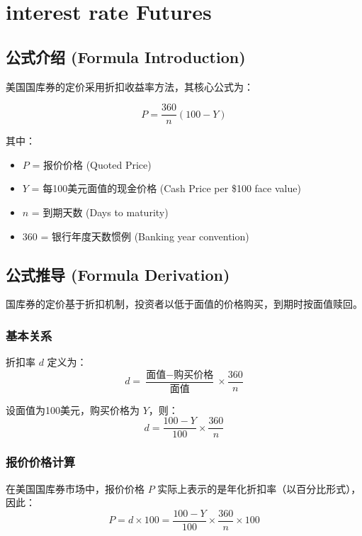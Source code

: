 \chapter{interest rate Futures}

\section{公式介绍 (Formula Introduction)}

美国国库券的定价采用折扣收益率方法，其核心公式为：

\begin{equation}
P = \frac{360}{n}(100 - Y)
\end{equation}

其中：
\begin{itemize}
    \item $P$ = 报价价格 (Quoted Price)
    \item $Y$ = 每100美元面值的现金价格 (Cash Price per \$100 face value)
    \item $n$ = 到期天数 (Days to maturity)
    \item $360$ = 银行年度天数惯例 (Banking year convention)
\end{itemize}

\section{公式推导 (Formula Derivation)}

国库券的定价基于折扣机制，投资者以低于面值的价格购买，到期时按面值赎回。

\subsection{基本关系}
折扣率 $d$ 定义为：
\begin{equation}
d = \frac{\text{面值} - \text{购买价格}}{\text{面值}} \times \frac{360}{n}
\end{equation}

设面值为100美元，购买价格为 $Y$，则：
\begin{equation}
d = \frac{100 - Y}{100} \times \frac{360}{n}
\end{equation}

\subsection{报价价格计算}
在美国国库券市场中，报价价格 $P$ 实际上表示的是年化折扣率（以百分比形式），因此：
\begin{equation}
P = d \times 100 = \frac{100 - Y}{100} \times \frac{360}{n} \times 100
\end{equation}

